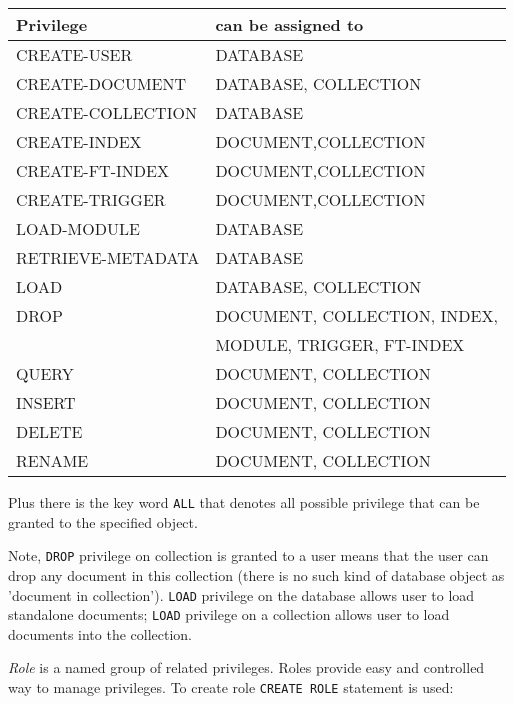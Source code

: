 \documentclass[a4paper,12pt]{article}
\begin{document}
\begin{tabular}{|l|l|}
\hline
\hline
Privilege            & can be assigned to             \\
\hline
\hline
CREATE-USER          & DATABASE                       \\
\hline
CREATE-DOCUMENT      & DATABASE, COLLECTION           \\
\hline
CREATE-COLLECTION    & DATABASE                       \\
\hline
CREATE-INDEX         & DOCUMENT,COLLECTION            \\
\hline
CREATE-FT-INDEX      & DOCUMENT,COLLECTION            \\
\hline
CREATE-TRIGGER       & DOCUMENT,COLLECTION            \\
\hline
LOAD-MODULE          & DATABASE                       \\
\hline
RETRIEVE-METADATA    & DATABASE                       \\
\hline
LOAD                 & DATABASE, COLLECTION           \\
\hline
DROP                 & DOCUMENT, COLLECTION, INDEX,   \\
                     & MODULE, TRIGGER, FT-INDEX      \\
\hline
QUERY                & DOCUMENT, COLLECTION           \\
\hline
INSERT               & DOCUMENT, COLLECTION           \\
\hline
DELETE               & DOCUMENT, COLLECTION           \\
\hline
RENAME               & DOCUMENT, COLLECTION           \\
\hline
\end{tabular}

\medskip

Plus there is the key word \verb!ALL! that denotes all possible privilege that
can be granted to the specified object.

Note, \verb!DROP! privilege on collection is granted to a user means that the
user can drop any document in this collection (there is no such kind of database
object as 'document in collection'). \verb!LOAD! privilege on the database
allows user to load standalone documents; \verb!LOAD! privilege on a collection
allows user to load documents into the collection.

\emph{Role} is a named group of related privileges. Roles provide easy and
controlled way to manage privileges. To create role \verb!CREATE ROLE! statement
is used:
\end{document}

